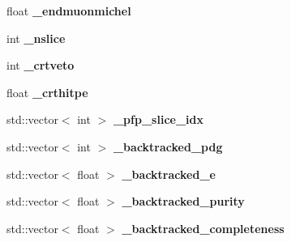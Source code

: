 \begin{DoxyCompactItemize}
\item 
\hypertarget{classanalysis_1_1DefaultAnalysis_a3797bcb310074825add03ce03175fdc3}{float {\bfseries \-\_\-endmuonmichel}}\label{classanalysis_1_1DefaultAnalysis_a3797bcb310074825add03ce03175fdc3}

\item 
\hypertarget{classanalysis_1_1DefaultAnalysis_a3eddf49910782afed7f324755fffe681}{int {\bfseries \-\_\-nslice}}\label{classanalysis_1_1DefaultAnalysis_a3eddf49910782afed7f324755fffe681}

\item 
\hypertarget{classanalysis_1_1DefaultAnalysis_a84ce9904fa527012a65c2be203a38d38}{int {\bfseries \-\_\-crtveto}}\label{classanalysis_1_1DefaultAnalysis_a84ce9904fa527012a65c2be203a38d38}

\item 
\hypertarget{classanalysis_1_1DefaultAnalysis_a900ec35e3ca4a00d4625a1e632bb6b40}{float {\bfseries \-\_\-crthitpe}}\label{classanalysis_1_1DefaultAnalysis_a900ec35e3ca4a00d4625a1e632bb6b40}

\item 
\hypertarget{classanalysis_1_1DefaultAnalysis_acbf0c279993cbefca72f38bc5e9f6627}{std\-::vector$<$ int $>$ {\bfseries \-\_\-pfp\-\_\-slice\-\_\-idx}}\label{classanalysis_1_1DefaultAnalysis_acbf0c279993cbefca72f38bc5e9f6627}

\item 
\hypertarget{classanalysis_1_1DefaultAnalysis_a28bd59dce75b8fd3be70bd4996354ae9}{std\-::vector$<$ int $>$ {\bfseries \-\_\-backtracked\-\_\-pdg}}\label{classanalysis_1_1DefaultAnalysis_a28bd59dce75b8fd3be70bd4996354ae9}

\item 
\hypertarget{classanalysis_1_1DefaultAnalysis_a2c16b4988d0bccf8b7ef96a52c173b80}{std\-::vector$<$ float $>$ {\bfseries \-\_\-backtracked\-\_\-e}}\label{classanalysis_1_1DefaultAnalysis_a2c16b4988d0bccf8b7ef96a52c173b80}

\item 
\hypertarget{classanalysis_1_1DefaultAnalysis_ad08d9b30c434685e350c5f292d4df08b}{std\-::vector$<$ float $>$ {\bfseries \-\_\-backtracked\-\_\-purity}}\label{classanalysis_1_1DefaultAnalysis_ad08d9b30c434685e350c5f292d4df08b}

\item 
\hypertarget{classanalysis_1_1DefaultAnalysis_a60ef3ec6e332c118c088e0203fb858d6}{std\-::vector$<$ float $>$ {\bfseries \-\_\-backtracked\-\_\-completeness}}\label{classanalysis_1_1DefaultAnalysis_a60ef3ec6e332c118c088e0203fb858d6}


\end{DoxyCompactItemize}
